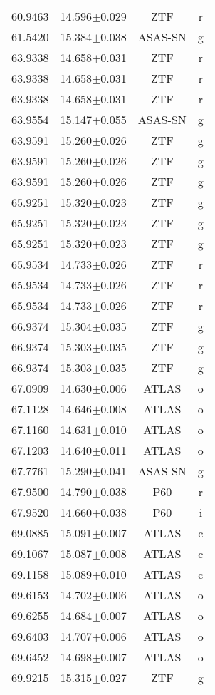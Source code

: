 \begin{table}
\begin{tabular}{cccc}
60.9463 & 14.596$\pm$0.029 & ZTF & r \\
61.5420 & 15.384$\pm$0.038 & ASAS-SN & g \\
63.9338 & 14.658$\pm$0.031 & ZTF & r \\
63.9338 & 14.658$\pm$0.031 & ZTF & r \\
63.9338 & 14.658$\pm$0.031 & ZTF & r \\
63.9554 & 15.147$\pm$0.055 & ASAS-SN & g \\
63.9591 & 15.260$\pm$0.026 & ZTF & g \\
63.9591 & 15.260$\pm$0.026 & ZTF & g \\
63.9591 & 15.260$\pm$0.026 & ZTF & g \\
65.9251 & 15.320$\pm$0.023 & ZTF & g \\
65.9251 & 15.320$\pm$0.023 & ZTF & g \\
65.9251 & 15.320$\pm$0.023 & ZTF & g \\
65.9534 & 14.733$\pm$0.026 & ZTF & r \\
65.9534 & 14.733$\pm$0.026 & ZTF & r \\
65.9534 & 14.733$\pm$0.026 & ZTF & r \\
66.9374 & 15.304$\pm$0.035 & ZTF & g \\
66.9374 & 15.303$\pm$0.035 & ZTF & g \\
66.9374 & 15.303$\pm$0.035 & ZTF & g \\
67.0909 & 14.630$\pm$0.006 & ATLAS & o \\
67.1128 & 14.646$\pm$0.008 & ATLAS & o \\
67.1160 & 14.631$\pm$0.010 & ATLAS & o \\
67.1203 & 14.640$\pm$0.011 & ATLAS & o \\
67.7761 & 15.290$\pm$0.041 & ASAS-SN & g \\
67.9500 & 14.790$\pm$0.038 & P60 & r \\
67.9520 & 14.660$\pm$0.038 & P60 & i \\
69.0885 & 15.091$\pm$0.007 & ATLAS & c \\
69.1067 & 15.087$\pm$0.008 & ATLAS & c \\
69.1158 & 15.089$\pm$0.010 & ATLAS & c \\
69.6153 & 14.702$\pm$0.006 & ATLAS & o \\
69.6255 & 14.684$\pm$0.007 & ATLAS & o \\
69.6403 & 14.707$\pm$0.006 & ATLAS & o \\
69.6452 & 14.698$\pm$0.007 & ATLAS & o \\
69.9215 & 15.315$\pm$0.027 & ZTF & g \\

\end{tabular}
\end{table}
